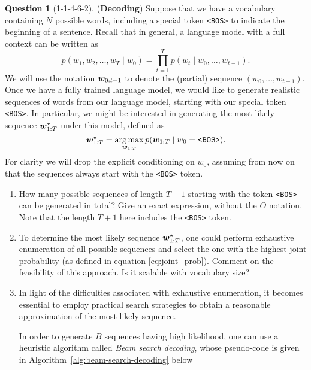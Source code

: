 \documentclass[12pt]{article}
\theoremstyle{definition}
\newtheorem{exercise}{Question}%
\begin{document}
\begin{exercise}[1-1-4-6-2] (\textbf{Decoding})
\label{ex:decoding}
    Suppose that we have a vocabulary containing $N$ possible words, including a special token \texttt{<BOS>} to indicate the beginning of a sentence. Recall that in general, a language model with a full context can be written as
    \begin{equation*}
        p(w_{1}, w_{2}, \ldots, w_{T} \mid w_{0}) = \prod_{t=1}^{T} p(w_{t} \mid w_{0}, \ldots, w_{t-1}).
    \end{equation*}
    We will use the notation ${\bm{w}}_{0:t-1}$ to denote the (partial) sequence $(w_{0}, \ldots, w_{t-1})$. Once we have a fully trained language model, we would like to generate realistic sequences of words from our language model, starting with our special token \texttt{<BOS>}. In particular, we might be interested in generating the most likely sequence ${\bm{w}}_{1:T}^{\star}$ under this model, defined as
    \begin{equation}
        {\bm{w}}_{1:T}^{\star} = \operatorname*{arg\,max}_{{\bm{w}}_{1:T}} p({\bm{w}}_{1:T} \mid w_{0} = \textrm{\texttt{<BOS>}}).
        \label{eq:joint_prob}
    \end{equation}
    For clarity we will drop the explicit conditioning on $w_{0}$, assuming from now on that the sequences always start with the \texttt{<BOS>} token.
    
    \begin{enumerate}[label=\arabic{exercise}.\arabic*]
        \item How many possible sequences of length $T+1$ starting with the token \texttt{<BOS>} can be generated in total? Give an exact expression, without the $O$ notation. Note that the length $T+1$ here includes the \texttt{<BOS>} token.
        
        \item To determine the most likely sequence ${\bm{w}}_{1:T}^{\star}$, one could perform exhaustive enumeration of all possible sequences and select the one with the highest joint probability (as defined in equation \ref{eq:joint_prob}). Comment on the feasibility of this approach. Is it scalable with vocabulary size?
    
        \item In light of the difficulties associated with exhaustive enumeration, it becomes essential to employ practical search strategies to obtain a reasonable approximation of the most likely sequence.
        
        In order to generate $B$ sequences having high likelihood, one can use a heuristic algorithm called \emph{Beam search decoding}, whose pseudo-code is given in Algorithm~\ref{alg:beam-search-decoding} below
    

\end{enumerate}
\end{exercise}
\end{document}
